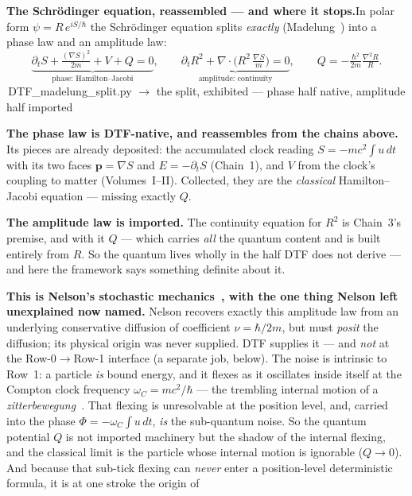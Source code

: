 \documentclass[11pt]{article}
\newcommand{\pychip}[2]{{\footnotesize\colorbox{cbPyBg}{\ttfamily\,#1\,}\,{\color{gray}$\to$ #2}}}
\begin{document}
\textbf{The Schr\"odinger equation, reassembled --- and where it stops.}\enspace In polar form
$\psi=R\,e^{iS/\hbar}$ the Schr\"odinger equation splits \emph{exactly} (Madelung~\cite{Madelung1927}) into
a phase law and an amplitude law:
\[
  \underbrace{\partial_t S+\tfrac{(\nabla S)^2}{2m}+V+Q=0}_{\text{phase: Hamilton--Jacobi}},
  \qquad
  \underbrace{\partial_t R^2+\nabla\!\cdot\!\Big(R^2\,\tfrac{\nabla S}{m}\Big)=0}_{\text{amplitude: continuity}},
  \qquad Q=-\tfrac{\hbar^2}{2m}\tfrac{\nabla^2 R}{R}.
\]
\pychip{DTF\_madelung\_split.py}{the split, exhibited --- phase half native, amplitude half imported}
\par\smallskip
\textbf{The phase law is DTF-native, and reassembles from the chains above.} Its pieces are already
deposited: the accumulated clock reading $S=-mc^2\!\int u\,dt$ with its two faces $\mathbf p=\nabla S$ and
$E=-\partial_t S$ (Chain~1), and $V$ from the clock's coupling to matter (Volumes~I--II). Collected, they
are the \emph{classical} Hamilton--Jacobi equation --- missing exactly $Q$.
\par\smallskip
\textbf{The amplitude law is imported.} The continuity equation for $R^2$ is Chain~3's premise, and with it
$Q$ --- which carries \emph{all} the quantum content and is built entirely from $R$. So the quantum lives
wholly in the half DTF does not derive --- and here the framework says something definite about it.
\par\smallskip
\textbf{This is Nelson's stochastic mechanics~\cite{Nelson1966}, with the one thing Nelson left unexplained
now named.} Nelson recovers exactly this amplitude law from an underlying conservative diffusion of
coefficient $\nu=\hbar/2m$, but must \emph{posit} the diffusion; its physical origin was never supplied.
DTF supplies it --- and \emph{not} at the Row-0$\to$Row-1 interface (a separate job, below). The noise is
intrinsic to Row~1: a particle \emph{is} bound energy, and it
flexes as it oscillates inside itself at the Compton clock frequency $\omega_C=mc^2/\hbar$ --- the trembling
internal motion of a \emph{zitterbewegung}~\cite{Schrodinger1930,Hestenes1990}. That flexing is unresolvable
at the position level, and, carried into the phase $\Phi=-\omega_C\!\int u\,dt$, \emph{is} the sub-quantum
noise. So the quantum potential $Q$ is not imported machinery but the shadow of the internal flexing, and
the classical limit is the particle whose internal motion is ignorable ($Q\to0$). And because that sub-tick
flexing can \emph{never} enter a position-level deterministic formula, it is at one stroke the origin of
\end{document}
